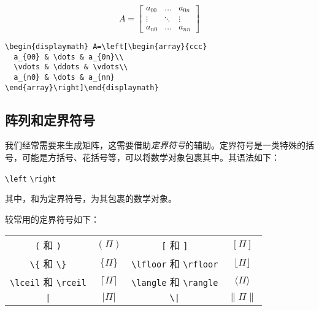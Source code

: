 \begin{codelist}[3.15]{
  \begin{displaymath} A=\left[\begin{array}{ccc}
    a_{00} & \dots & a_{0n}\\
    \vdots & \ddots & \vdots\\
    a_{n0} & \dots & a_{nn}
  \end{array}\right]\end{displaymath}
}\begin{verbatim}
\begin{displaymath} A=\left[\begin{array}{ccc}
  a_{00} & \dots & a_{0n}\\
  \vdots & \ddots & \vdots\\
  a_{n0} & \dots & a_{nn}
\end{array}\right]\end{displaymath}
\end{verbatim}
\end{codelist}

\subsection{阵列和定界符号}

我们经常需要来生成矩阵，这需要借助\emph{定界符号}的辅助。定界符号是一类特殊的括号，可能是方括号、花括号等，可以将数学对象包裹其中。其语法如下：

\begin{dmd}
\verb|\left|  \verb|\right|
\end{dmd}

其中，和为定界符号，为其包裹的数学对象。

较常用的定界符号如下：

\begin{center}
  \begin{tabular}{cccc}
    \verb+(+ 和 \verb+)+               & $(\Pi)$             &
    \verb+[+ 和 \verb+]+               & $[\Pi]$             \\
    \verb+\{+ 和 \verb+\}+             & $\{\Pi\}$           &
    \verb|\lfloor| 和 \verb|\rfloor| & $\lfloor\Pi\rfloor$ \\
    \verb|\lceil| 和 \verb|\rceil|   & $\lceil\Pi\rceil$   &
    \verb|\langle| 和 \verb|\rangle| & $\langle\Pi\rangle$  \\
    \verb+|+                           & $|\Pi|$             &
    \verb+\|+                         & $\|\Pi\|$           
  \end{tabular}
\end{center}

